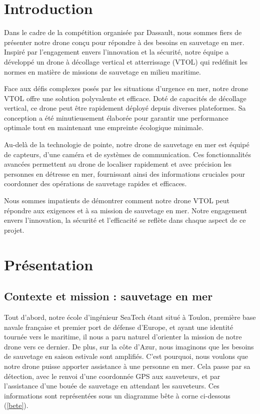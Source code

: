 \documentclass[a4paper,12pt,french]{report}
\begin{document}
\chapter*{Introduction}

Dans le cadre de la compétition organisée par Dassault, nous sommes fiers de présenter notre drone conçu pour répondre à des besoins en sauvetage en mer. Inspiré par l'engagement envers l'innovation et la sécurité, notre équipe a développé un drone à décollage vertical et atterrissage (VTOL) qui redéfinit les normes en matière de missions de sauvetage en milieu maritime.\newline

Face aux défis complexes posés par les situations d'urgence en mer, notre drone VTOL offre une solution polyvalente et efficace. Doté de capacités de décollage vertical, ce drone peut être rapidement déployé depuis diverses plateformes. Sa conception a été minutieusement élaborée pour garantir une performance optimale tout en maintenant une empreinte écologique minimale.\newline

Au-delà de la technologie de pointe, notre drone de sauvetage en mer est équipé de capteurs, d’une caméra et de systèmes de communication. Ces fonctionnalités avancées permettent au drone de localiser rapidement et avec précision les personnes en détresse en mer, fournissant ainsi des informations cruciales pour coordonner des opérations de sauvetage rapides et efficaces.\newline

Nous sommes impatients de démontrer comment notre drone VTOL peut répondre aux exigences et à sa mission de sauvetage en mer. Notre engagement envers l'innovation, la sécurité et l'efficacité se reflète dans chaque aspect de ce projet.

\chapter{Présentation}

\section{Contexte et mission : sauvetage en mer}

Tout d'abord, notre école d'ingénieur SeaTech étant situé à Toulon, première base navale française et premier port de défense d'Europe, et ayant une identité tournée vers le maritime, il nous a paru naturel d'orienter la mission de notre drone vers ce dernier. De plus, sur la côte d'Azur, nous imaginons que les besoins de sauvetage en saison estivale sont amplifiés. C'est pourquoi, nous voulons que notre drone puisse apporter assistance à une personne en mer. Cela passe par sa détection, avec le renvoi d'une coordonnée GPS aux sauveteurs, et par l'assistance d'une bouée de sauvetage en attendant les sauveteurs. Ces informations sont représentées sous un diagramme bête à corne ci-dessous (\ref{bete}).
\bigskip
\end{document}
